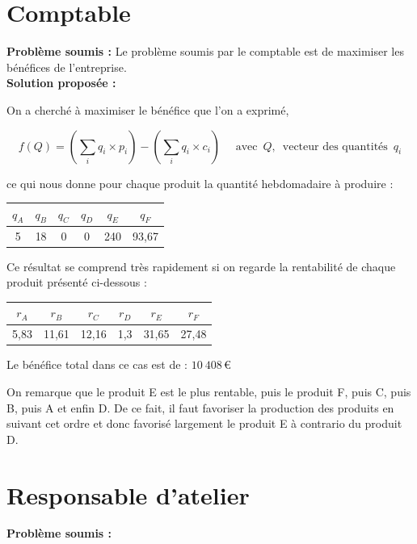 \documentclass[paper=a4, fontsize=11pt]{report}
\numberwithin{equation}{section}		%
\numberwithin{figure}{section}			%
\numberwithin{table}{section}				%
\renewcommand{\bf}[1]{\textbf{#1}}
\begin{document}
\section{Comptable}
\bf{Problème soumis :}
Le problème soumis par le comptable est de maximiser les bénéfices de l'entreprise.\\

\bf{Solution proposée :}

On a cherché à maximiser le bénéfice que l'on a exprimé, 

\[f(Q) = (\sum_i q_i \times p_i ) - (\sum_i q_i \times c_i) \quad \text{  avec } \, Q, \, \text{ vecteur des quantités } \, q_i \]

ce qui nous donne pour chaque produit la quantité hebdomadaire à produire :
\begin{center}
\begin{tabular}{cccccc}
\hline
$q_A$ & $q_B$ & $q_C$ & $q_D$ & $q_E$ & $q_F$ \\
\hline
5 & 18 & 0 & 0 & 240 & 93,67 \\
\hline
\end{tabular}
\end{center}

Ce résultat se comprend très rapidement si on regarde la rentabilité de chaque produit présenté ci-dessous :

\begin{center}
\begin{tabular}{cccccc}
\hline
$r_A$ & $r_B$ & $r_C$ & $r_D$ & $r_E$ & $r_F$ \\
\hline
5,83 & 11,61 & 12,16 & 1,3 & 31,65 & 27,48 \\
\hline
\end{tabular}
\end{center}

Le bénéfice total dans ce cas est de : $10\:408\,$€

On remarque que le produit E est le plus rentable, puis le produit F, puis C, puis B, puis A et enfin D.
De ce fait, il faut favoriser la production des produits en suivant cet ordre et donc favorisé largement le produit E à contrario du produit D.


\section{Responsable d'atelier}
\bf{Problème soumis :}
\end{document}
